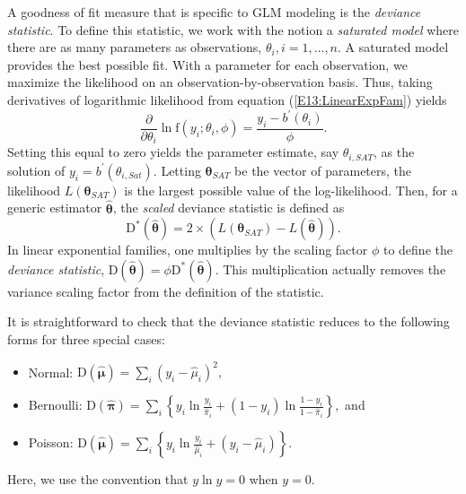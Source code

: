 A goodness of fit measure that is specific to GLM modeling is the
\emph{deviance statistic}. To define this statistic, we work with
the notion a \emph{saturated model} where there are as many
parameters as observations, $\theta_i, i=1, \ldots, n$. A saturated
model provides the best possible fit. With a parameter for each
observation, we maximize the likelihood on an
observation-by-observation basis. Thus, taking derivatives of
logarithmic likelihood from equation (\ref{E13:LinearExpFam}) yields
\begin{equation*}
\frac{\partial}{\partial \theta_i} \ln \mathrm{f}( y_i; \theta_i
,\phi ) = \frac{y_i-b^{\prime}(\theta_i)}{\phi}.
\end{equation*}
Setting this equal to zero yields the parameter estimate, say
$\theta_{i,SAT}$, as the solution of
$y_i=b^{\prime}(\theta_{i,Sat})$. Letting $\boldsymbol \theta
_{SAT}$ be the vector of parameters, the likelihood $L(\boldsymbol
\theta _{SAT})$ is the largest possible value of the log-likelihood.
Then, for a generic estimator $\widehat{\boldsymbol \theta}$, the
\emph{scaled} deviance statistic is defined as
\begin{equation*}
\mathbf{\mathrm{D}}^{\ast}(\widehat{\boldsymbol \theta}) = 2 \times
\left( L(\boldsymbol \theta _{SAT}) - L(\widehat{\boldsymbol
\theta}) \right). \end{equation*} In linear exponential families,
one multiplies by the scaling factor $\phi$ to define the
\emph{deviance statistic}, $\mathbf{\mathrm{D}}(\widehat{\boldsymbol
\theta}) = \phi \mathbf{\mathrm{D}}^{\ast}(\widehat{\boldsymbol
\theta}) $. This multiplication actually removes the variance
scaling factor from the definition of the statistic.

It is straightforward to check that the deviance statistic reduces
to the following forms for three special cases:
\begin{itemize}
  \item Normal: $\mathbf{\mathrm{D}}(\widehat{\boldsymbol
  \mu})= \sum_i \left( y_i - \widehat \mu _i \right) ^2 ,$
  \item Bernoulli: $\mathbf{\mathrm{D}}(\widehat{\boldsymbol
  \pi})= \sum_i \left\{ y_i \ln \frac {y_i}{\widehat \pi_i} + (1-y_i) \ln \frac {1-y_i}{1-\widehat \pi_i}  \right\}
  ,$ and
  \item Poisson: $\mathbf{\mathrm{D}}(\widehat{\boldsymbol
  \mu})= \sum_i \left\{ y_i \ln \frac {y_i}{\widehat \mu_i} + (y_i - \widehat \mu _i) \right\}.$
\end{itemize}
Here, we use the convention that $y \ln y = 0$ when $y = 0$.



